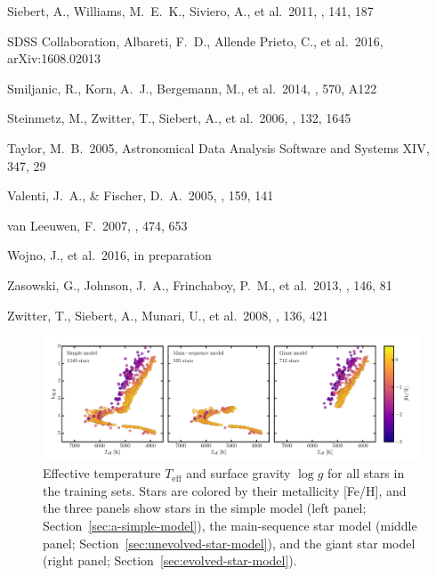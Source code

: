 \documentclass[preprint]{aastex}
\newcommand{\teff}{T_{\mathrm{eff}}}
\newcommand{\logg}{\log g}
\begin{document}
\begin{thebibliography}{dummy}
 Siebert, A., Williams, M.~E.~K., Siviero, A., et al.\ 2011, \aj, 141, 187 

 SDSS Collaboration, Albareti, F.~D., Allende Prieto, C., et al.\ 2016, arXiv:1608.02013 

 Smiljanic, R., Korn, A.~J., Bergemann, M., et al.\ 2014, \aap, 570, A122 

 Steinmetz, M., Zwitter, T., Siebert, A., et al.\ 2006, \aj, 132, 1645 

 Taylor, M.~B.\ 2005, Astronomical Data Analysis Software and Systems XIV, 347, 29 

 Valenti, J.~A., \& Fischer, D.~A.\ 2005, \apjs, 159, 141 

 van Leeuwen, F.\ 2007, \aap, 474, 653 

 Wojno, J., et al.\ 2016, in preparation

 Zasowski, G., Johnson, J.~A., Frinchaboy, P.~M., et al.\ 2013, \aj, 146, 81 

 Zwitter, T., Siebert, A., Munari, U., et al.\ 2008, \aj, 136, 421 

\end{thebibliography}



\clearpage

\begin{figure}[p]
\includegraphics[width=\textwidth]{hrd-train-set.pdf}
\caption{Effective temperature $\teff$ and surface gravity $\logg$ for all stars in the training sets. Stars are colored by their metallicity [Fe/H], and the three panels show stars in the simple model (left panel; Section~\ref{sec:a-simple-model}), the main-sequence star model (middle panel; Section~\ref{sec:unevolved-star-model}), and the giant star model (right panel; Section~\ref{sec:evolved-star-model}).\label{fig:training-set-hrd}}
\end{figure}
\end{document}
